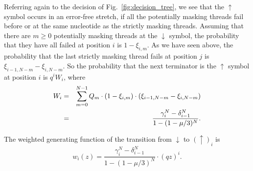 \documentclass{article}
\begin{document}
Referring again to the decision of Fig.~\ref{fig:decision_tree}, we see
that the $\uparrow$ symbol occurs in an error-free stretch, if all the
potentially masking threads fail before or at the same nucleotide as the
strictly masking threads. Assuming that there are $m \geq 0$ potentially
masking threads at the $\downarrow$ symbol, the probability that they have
all failed at position $i$ is $1-\xi_{i,m}$. As we have seen above, the
probability that the last strictly masking thread fails at position $j$ is
$\xi_{i-1,N-m}-\xi_{i,N-m}$. So the probability that the next terminator
is the $\uparrow$ symbol at position $i$ is $q^i W_i$, where
\begin{eqnarray}
  W_i &=& \sum_{m=0}^{N-1} Q_m \cdot (1-\xi_{i,m}) \cdot
  (\xi_{i-1,N-m}-\xi_{i,N-m}) \notag \\
    &=& \frac{\gamma_i^N-\delta_{i-1}^N}{1-(1-\mu/3)^N}.
\end{eqnarray}

The weighted generating function of the transition from $\downarrow$ to
$(\uparrow)_i$ is
\begin{equation}
w_i(z) = \frac{\gamma_i^N- \delta_{i-1}^N}{1-(1-\mu/3)^N} \cdot (qz)^i.
\end{equation}

%
\end{document}
